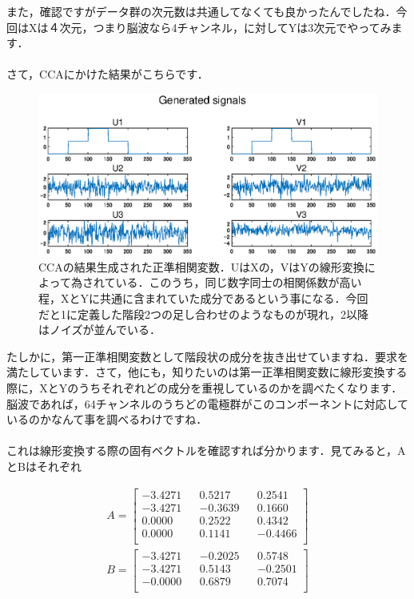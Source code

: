 \documentclass[11pt,a4paper,uplatex]{ujreport}
\begin{document}
また，確認ですがデータ群の次元数は共通してなくても良かったんでしたね．今回はXは４次元，つまり脳波なら4チャンネル，に対してYは3次元でやってみます．\\
\\

さて，CCAにかけた結果がこちらです．

\begin{figure}[H]
  \includegraphics[width=15cm]{../figures/CCA3.eps}
  \caption{CCAの結果生成された正準相関変数．UはXの，VはYの線形変換によって為されている．このうち，同じ数字同士の相関係数が高い程，XとYに共通に含まれていた成分であるという事になる．今回だと1に定義した階段2つの足し合わせのようなものが現れ，2以降はノイズが並んでいる．}
\end{figure}

たしかに，第一正準相関変数として階段状の成分を抜き出せていますね．要求を満たしています．さて，他にも，知りたいのは第一正準相関変数に線形変換する際に，XとYのうちそれぞれどの成分を重視しているのかを調べたくなります．脳波であれば，64チャンネルのうちどの電極群がこのコンポーネントに対応しているのかなんて事を調べるわけですね．\\
\\

これは線形変換する際の固有ベクトルを確認すれば分かります．見てみると，AとBはそれぞれ

\begin{align}
  A =
  \begin{bmatrix}
   -3.4271  &&  0.5217 &&   0.2541\\
   -3.4271  && -0.3639 &&   0.1660\\
    0.0000  &&  0.2522 &&   0.4342\\
    0.0000  &&  0.1141 &&  -0.4466\\
  \end{bmatrix}\\
  B =
  \begin{bmatrix}
   -3.4271 &&  -0.2025 &&   0.5748\\
   -3.4271 &&   0.5143 &&  -0.2501\\
   -0.0000 &&   0.6879 &&   0.7074\\
  \end{bmatrix}
\end{align}
\end{document}
